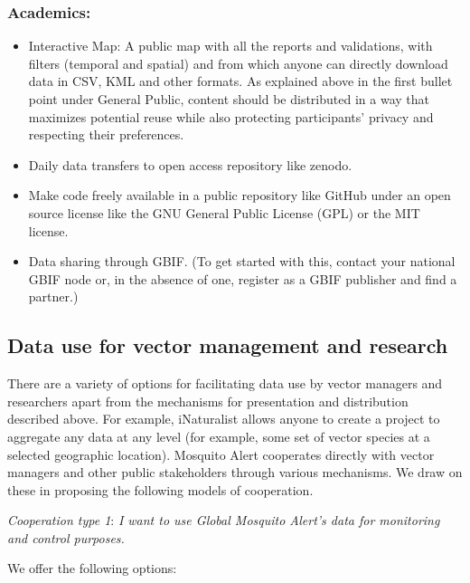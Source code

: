 \documentclass[]{article}
\providecommand{\tightlist}{%
  \setlength{\itemsep}{0pt}\setlength{\parskip}{0pt}}
\begin{document}
\hypertarget{academics}{%
\subsubsection{Academics:}\label{academics}}

\begin{itemize}
\tightlist
\item
  Interactive Map: A public map with all the reports and validations, with filters (temporal and spatial) and from which anyone can directly download data in CSV, KML and other formats. As explained above in the first bullet point under General Public, content should be distributed in a way that maximizes potential reuse while also protecting participants' privacy and respecting their preferences.
\item
  Daily data transfers to open access repository like zenodo.
\item
  Make code freely available in a public repository like GitHub under an open source license like the GNU General Public License (GPL) or the MIT license.
\item
  Data sharing through GBIF. (To get started with this, contact your national GBIF node or, in the absence of one, register as a GBIF publisher and find a partner.)
\end{itemize}

\hypertarget{data-use-for-vector-management-and-research}{%
\subsection{Data use for vector management and research}\label{data-use-for-vector-management-and-research}}

There are a variety of options for facilitating data use by vector managers and researchers apart from the mechanisms for presentation and distribution described above. For example, iNaturalist allows anyone to create a project to aggregate any data at any level (for example, some set of vector species at a selected geographic location). Mosquito Alert cooperates directly with vector managers and other public stakeholders through various mechanisms. We draw on these in proposing the following models of cooperation.

\emph{Cooperation type 1}: \emph{I want to use Global Mosquito Alert's data for monitoring and control purposes.}

We offer the following options:
\end{document}
